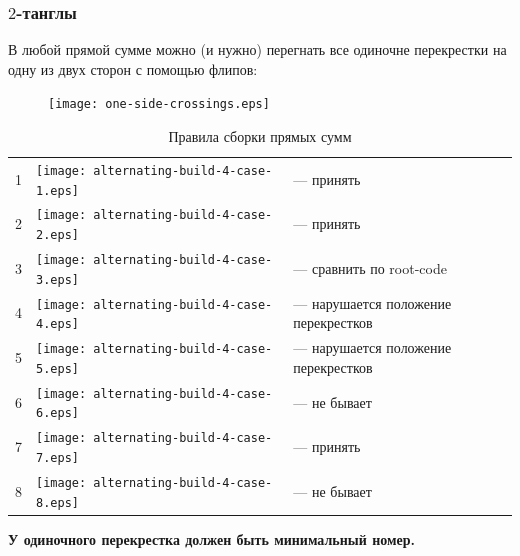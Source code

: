 \documentclass[dvips, intlimits, 9pt, unicode, notheorems, color=usenames,dvipsnames]{beamer}
\theoremstyle{plain}
\theoremstyle{definition}
\begin{document}
	\begin{frame}
		\frametitle{$2$-танглы}

		В любой прямой сумме можно (и нужно) перегнать все одиночне перекрестки на одну из двух сторон с помощью флипов:
		\begin{figure}[ht]
			\centering
			\texttt{[image: one-side-crossings.eps]}
		\end{figure}

		\vspace{-6mm}
		\begin{table}[ht]
			\caption{Правила сборки прямых сумм\label{table:sums-rules}}
			\centering
			\begin{tabular}{cm{22mm}l}
				\hline
				1 & \texttt{[image: alternating-build-4-case-1.eps]} & --- принять \\
				2 & \texttt{[image: alternating-build-4-case-2.eps]} & --- принять \\
				3 & \texttt{[image: alternating-build-4-case-3.eps]} & --- сравнить по root-code \\
				4 & \texttt{[image: alternating-build-4-case-4.eps]} & --- нарушается положение перекрестков \\
				5 & \texttt{[image: alternating-build-4-case-5.eps]} & --- нарушается положение перекрестков \\
				6 & \texttt{[image: alternating-build-4-case-6.eps]} & --- не бывает \\
				7 & \texttt{[image: alternating-build-4-case-7.eps]} & --- принять \\
				8 & \texttt{[image: alternating-build-4-case-8.eps]} & --- не бывает \\
				\hline
			\end{tabular}
		\end{table}

		\begin{center}
			{\bf У одиночного перекрестка должен быть минимальный номер.}
		\end{center}
	\end{frame}
\end{document}
